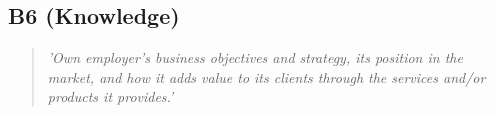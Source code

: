 \subsection{B6 (Knowledge)}

  \begin{quote}
    \textit{'Own employer’s business objectives
    and strategy, its position in the market, and how it adds
    value to its clients through the services and/or products it
    provides.'}
  \end{quote}

\newpage